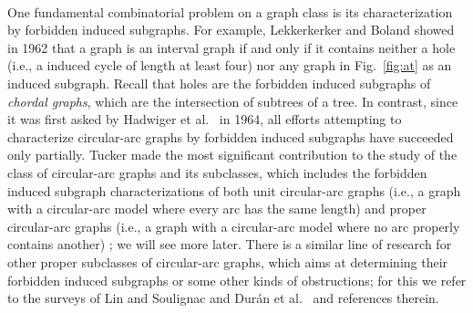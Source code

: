\documentclass[10pt]{article}
\begin{document}
\begin{figure*}[h]
  \centering\footnotesize
  $\,$
  $\,$
  $\,$
  \caption{Chordal minimal forbidden induced graphs.}
  \label{fig:at}
\end{figure*}

One fundamental combinatorial problem on a graph class is its
characterization by forbidden induced subgraphs.  For example,
Lekkerkerker and Boland \cite{lekkerkerker-62-interval-graphs} showed
in 1962 that a graph is an interval graph if and only if it contains
neither a hole (i.e., a induced cycle of length at least four) nor any
graph in Fig.~\ref{fig:at} as an induced subgraph.  Recall that holes
are the forbidden induced subgraphs of \emph{chordal graphs}, which
are the intersection of subtrees of a tree.  In contrast, since it was
first asked by Hadwiger et
al.~\cite{hadwiger-64-combinatorial-geometry} in 1964, all efforts
attempting to characterize circular-arc graphs by forbidden induced
subgraphs have succeeded only partially.  Tucker made the most
significant contribution to the study of the class of circular-arc
graphs and its subclasses, which includes the forbidden induced
subgraph characterizations of both unit circular-arc graphs (i.e., a
graph with a circular-arc model where every arc has the same length)
and proper circular-arc graphs (i.e., a graph with a circular-arc
model where no arc properly contains another)
\cite{tucker-74-structures-cag}; we will see more later.  There is a
similar line of research for other proper subclasses of circular-arc
graphs, which aims at determining their forbidden induced subgraphs or
some other kinds of obstructions; for this we refer to the surveys of
Lin and Soulignac \cite{lin-09-cag-and-subclasses} and Dur\'an et
al.~\cite{duran-14-survey} and references therein.
\end{document}
